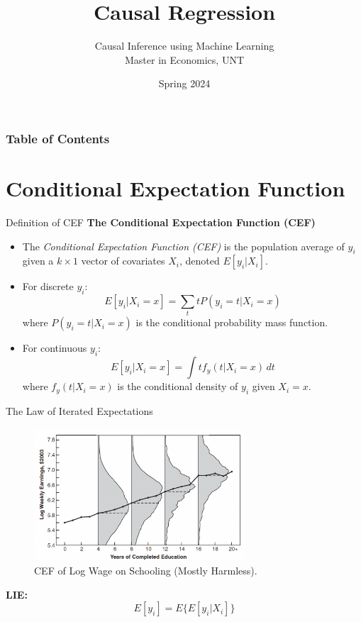 \documentclass[xcolor=svgnames,t]{beamer}
\title[Causal Regression]{Causal Regression}
\subtitle{}
\author[CIML ]{Causal Inference using Machine Learning\\ Master in Economics, UNT}
\institute[]{Andres Mena}
\date{Spring 2024}
\begin{document}
\begin{frame}
\maketitle
\end{frame}


\begin{frame}
    \frametitle{Table of Contents}
    \tableofcontents
\end{frame}

\section{Conditional Expectation Function}
\begin{frame}{Definition of CEF}
    \textbf{The Conditional Expectation Function (CEF)}
    \begin{itemize}
        \item The \textit{Conditional Expectation Function (CEF)} is the population average of \( y_i \) given a \( k \times 1 \) vector of covariates \( X_i \), denoted \( E[y_i | X_i] \).
        \pause
        \item For discrete \( y_i \):
        \[
        E[y_i | X_i = x] = \sum_t t P(y_i = t | X_i = x)
        \]
        where \( P(y_i = t | X_i = x) \) is the conditional probability mass function.
        \pause
        \item For continuous \( y_i \):
        \[
        E[y_i | X_i = x] = \int t f_y(t | X_i = x) \, dt
        \]
        where \( f_y(t | X_i = x) \) is the conditional density of \( y_i \) given \( X_i = x \).
        
    \end{itemize}
\end{frame}

\begin{frame}{The Law of Iterated Expectations}
    
       
   
    
    
    \begin{figure}[ht]
        \centering
        \includegraphics[width=0.7\textwidth]{Figures/CEF.png}
        \caption{CEF of Log Wage on Schooling (Mostly Harmless).}
        \label{fig:cef}
    \end{figure}
    \textbf{LIE:}
    \[
    E[y_i] = E\{E[y_i | X_i]\}
    \]
  
\end{frame}
\end{document}
